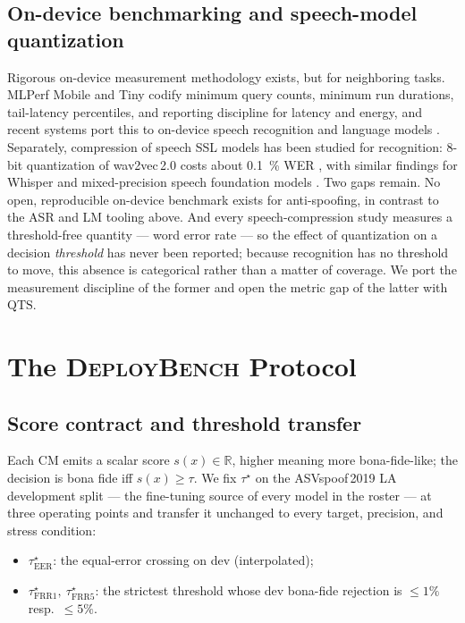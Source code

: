 \documentclass[journal]{IEEEtran}
\newcommand{\bench}{\textsc{DeployBench}}
\newcommand{\qts}{\mathrm{QTS}}
\newcommand{\frr}{\mathrm{FRR}}
\newcommand{\eer}{\mathrm{EER}}
\newcommand{\taustar}{\tau^{\star}}
\begin{document}
\subsection{On-device benchmarking and speech-model quantization}
Rigorous on-device measurement methodology exists, but for neighboring tasks.
MLPerf Mobile and Tiny \cite{reddi22_mlperf_mobile,mlperf_tiny} codify minimum
query counts, minimum run durations, tail-latency percentiles, and reporting
discipline for latency and energy, and recent systems
port this to on-device speech recognition and language models
\cite{whisperkit25}. Separately, compression of speech SSL models has been
studied for recognition: 8-bit quantization of wav2vec\,2.0 costs about
\SI{0.1}{\percent} WER \cite{pimentel23_ssl_compression}, with similar findings
for Whisper and mixed-precision speech foundation models
\cite{quantwhisper25,mixedprec25}. Two gaps remain. No open, reproducible
on-device benchmark exists for anti-spoofing, in contrast to the ASR and LM
tooling above. And every speech-compression study measures a threshold-free
quantity --- word error rate --- so the effect of quantization on a decision
\emph{threshold} has never been reported; because recognition has no threshold to
move, this absence is categorical rather than a matter of coverage. We port the
measurement discipline of the former and open the metric gap of the latter
with \(\qts\).

\section{The \bench{} Protocol}
\label{sec:protocol}

\subsection{Score contract and threshold transfer}
Each CM emits a scalar score \(s(x)\in\mathbb{R}\), higher meaning more
bona-fide-like; the decision is bona fide iff \(s(x)\ge\tau\). We fix
\(\taustar\) on the ASVspoof\,2019 LA development split --- the fine-tuning
source of every model in the roster --- at
three operating points and transfer it unchanged to every target, precision,
and stress condition:
\begin{itemize}
  \item \(\taustar_{\eer}\): the equal-error crossing on dev (interpolated);
  \item \(\taustar_{\frr1},\ \taustar_{\frr5}\): the strictest threshold whose
        dev bona-fide rejection is \(\le 1\%\) resp.\ \(\le 5\%\).
\end{itemize}
\end{document}
